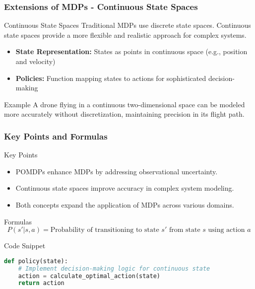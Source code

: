 \documentclass[aspectratio=169]{beamer}
\begin{document}
\begin{frame}[fragile]
    \frametitle{Extensions of MDPs - Continuous State Spaces}
    \begin{block}{Continuous State Spaces}
        Traditional MDPs use discrete state spaces. Continuous state spaces provide a more flexible and realistic approach for complex systems.
    \end{block}

    \begin{itemize}
        \item \textbf{State Representation:} States as points in continuous space (e.g., position and velocity)
        \item \textbf{Policies:} Function mapping states to actions for sophisticated decision-making
    \end{itemize}

    \begin{block}{Example}
        A drone flying in a continuous two-dimensional space can be modeled more accurately without discretization, maintaining precision in its flight path.
    \end{block}
\end{frame}

\begin{frame}[fragile]
    \frametitle{Key Points and Formulas}
    \begin{block}{Key Points}
        \begin{itemize}
            \item POMDPs enhance MDPs by addressing observational uncertainty.
            \item Continuous state spaces improve accuracy in complex system modeling.
            \item Both concepts expand the application of MDPs across various domains.
        \end{itemize}
    \end{block}

    \begin{block}{Formulas}
        \begin{equation}
            P(s'|s,a) = \text{Probability of transitioning to state } s' \text{ from state } s \text{ using action } a 
        \end{equation}
    \end{block}

    \begin{block}{Code Snippet}
        \begin{lstlisting}[language=Python]
def policy(state):
    # Implement decision-making logic for continuous state
    action = calculate_optimal_action(state)
    return action
        \end{lstlisting}
    \end{block}
\end{frame}
\end{document}
